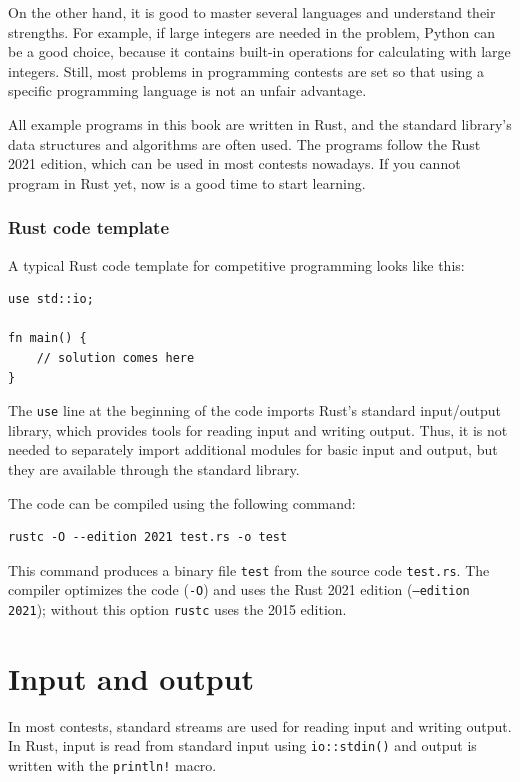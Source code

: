 On the other hand, it is good to
master several languages and understand
their strengths.
For example, if large integers are needed
in the problem,
Python can be a good choice, because it
contains built-in operations for
calculating with large integers.
Still, most problems in programming contests
are set so that
using a specific programming language
is not an unfair advantage.

All example programs in this book are written in Rust,
and the standard library's
data structures and algorithms are often used.
The programs follow the Rust 2021 edition,
which can be used in most contests nowadays.
If you cannot program in Rust yet,
now is a good time to start learning.

\subsubsection{Rust code template}

A typical Rust code template for competitive programming
looks like this:

\begin{lstlisting}
use std::io;

fn main() {
    // solution comes here
}
\end{lstlisting}

The \texttt{use} line at the beginning
of the code imports Rust's standard input/output
library, which provides tools for reading input
and writing output. Thus, it is not needed to separately
import additional modules for basic input and output,
but they are available through the standard library.

The code can be compiled using the following command:

\begin{lstlisting}
rustc -O --edition 2021 test.rs -o test
\end{lstlisting}

This command produces a binary file \texttt{test}
from the source code \texttt{test.rs}.
The compiler optimizes the code
(\texttt{-O}) and uses the Rust 2021 edition
(\texttt{--edition 2021});
without this option \texttt{rustc} uses the 2015 edition.

\section{Input and output}


In most contests, standard streams are used for
reading input and writing output.
In Rust, input is read from standard input using
\texttt{io::stdin()} and output is written with
the \texttt{println!} macro.

